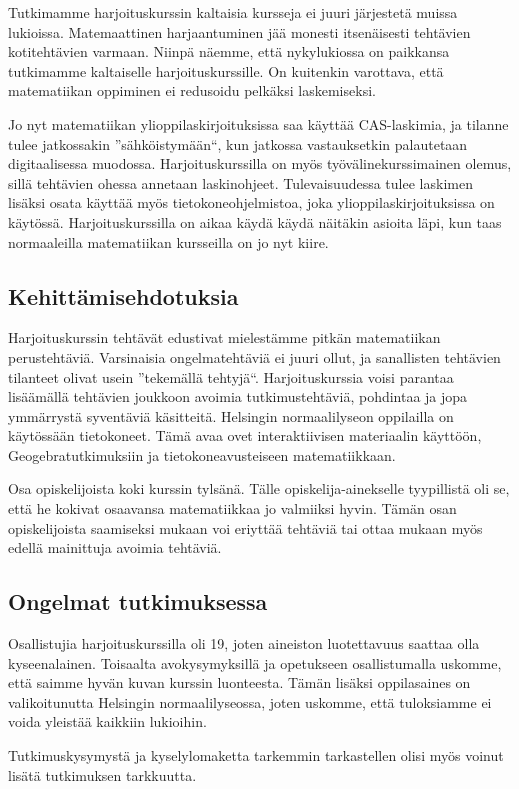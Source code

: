 Tutkimamme harjoituskurssin kaltaisia kursseja ei juuri järjestetä muissa lukioissa.
Matemaattinen harjaantuminen jää monesti itsenäisesti tehtävien kotitehtävien varmaan.
Niinpä näemme, että nykylukiossa on paikkansa tutkimamme kaltaiselle harjoituskurssille.%
On kuitenkin varottava, että matematiikan oppiminen ei redusoidu pelkäksi laskemiseksi.

Jo nyt matematiikan ylioppilaskirjoituksissa saa käyttää CAS-laskimia, ja tilanne tulee jatkossakin ''sähköistymään``, kun jatkossa vastauksetkin palautetaan digitaalisessa muodossa.
Harjoituskurssilla on myös työvälinekurssimainen olemus, sillä tehtävien ohessa annetaan laskinohjeet.
Tulevaisuudessa tulee laskimen lisäksi osata käyttää myös tietokoneohjelmistoa, joka ylioppilaskirjoituksissa on käytössä.
Harjoituskurssilla on aikaa käydä käydä näitäkin asioita läpi, kun taas normaaleilla matematiikan kursseilla on jo nyt kiire.

\subsection{Kehittämisehdotuksia}
Harjoituskurssin tehtävät edustivat mielestämme pitkän matematiikan perustehtäviä.
Varsinaisia ongelmatehtäviä ei juuri ollut, ja sanallisten tehtävien tilanteet olivat usein ''tekemällä tehtyjä``.
Harjoituskurssia voisi parantaa lisäämällä tehtävien joukkoon avoimia tutkimustehtäviä, pohdintaa ja jopa ymmärrystä syventäviä käsitteitä.
Helsingin normaalilyseon oppilailla on käytössään tietokoneet.
Tämä avaa ovet interaktiivisen materiaalin käyttöön, Geogebratutkimuksiin ja tietokoneavusteiseen matematiikkaan.

Osa opiskelijoista koki kurssin tylsänä.
Tälle opiskelija-ainekselle tyypillistä oli se, että he kokivat osaavansa matematiikkaa jo valmiiksi hyvin.
Tämän osan opiskelijoista saamiseksi mukaan voi eriyttää tehtäviä tai ottaa mukaan myös edellä mainittuja avoimia tehtäviä.

\subsection{Ongelmat tutkimuksessa}
Osallistujia harjoituskurssilla oli 19, joten aineiston luotettavuus saattaa olla kyseenalainen.
Toisaalta avokysymyksillä ja opetukseen osallistumalla uskomme, että saimme hyvän kuvan kurssin luonteesta.
Tämän lisäksi oppilasaines on valikoitunutta Helsingin normaalilyseossa, joten uskomme, että tuloksiamme ei voida yleistää kaikkiin lukioihin.

Tutkimuskysymystä ja kyselylomaketta tarkemmin tarkastellen olisi myös voinut lisätä tutkimuksen tarkkuutta.


